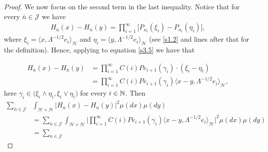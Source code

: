 \documentclass[review,onefignum,onetabnum]{siamart190516}
\begin{document}
\begin{proof}
        We now focus on the second term in the last inequality. Notice that for 
        every
        $\bar n\in \mathcal{J}$ we have
        \begin{align}\label{s3.5}
            H_{\bar n}(x) - H_{\bar n}(y) =
                \prod_{i = 1} ^ \infty
            \Big[
                P_{n_i}( \xi_i ) - P_{n_i} (\eta_i)
            \Big],
        \end{align}
        where $\xi_i= \langle x,\Lambda^{-1/2}e_i\rangle_{\mathcal{H}}$ and 
        $\eta_i=
        \langle y,\Lambda^{-1/2}e_i\rangle_{\mathcal{H}}$
        (see \eqref{s1.2} and lines after that for the definition).
        Hence, applying  to equation \eqref{s3.5} we have that
        
        \begin{equation}
        \label{s3.6}
        \begin{aligned}
            H_{\bar n}(x)-H_{\bar n}(y)&=\prod_{i=1}^\infty 
            C(i)Pe_{i+1}(\gamma_i)
            \cdot
            (\xi_i-\eta_i)
            \\
            &=
            \prod_{i=1}^\infty
            C(i)Pe_{i+1}(\gamma_i)
            \langle
                x-y, \Lambda^{-1/2}e_i
            \rangle_{\mathcal{H}},
         \end{aligned}
        \end{equation}
        here $\gamma_i\in \big(\xi_i\wedge\eta_i, \xi_i\vee \eta_i  \big)$
        for every $i\in {\mathbb N}$.
        Then
        \begin{equation}
            \label{s3.8}
            \begin{aligned}
                \sum_{\bar n\in \mathcal{J}}
                &
                \int_{\mathcal{H}\times \mathcal{H}}
                    \big|
                        H_{\bar n}(x) -H_{\bar n}(y)
                    \big|^2
                \mu(dx)\mu(dy)
                \\
                &=
                \sum_{\bar n\in \mathcal{J}}
                    \int_{\mathcal{H}\times \mathcal{H}}
                        \Big|
                            \prod_{i=1}^\infty C(i)Pe_{i+1}(\gamma_i)
                            \langle
                                x-y,
                                \Lambda^{-1/2}e_i
                            \rangle_{\mathcal{H}}
                        \Big|^2
                \mu(dx)\mu(dy)
                \\
                &=
                \sum_{\bar n\in \mathcal{J}}

\end{aligned}
\end{equation}
\end{proof}
\end{document}
